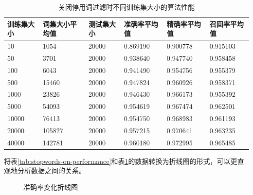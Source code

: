 \documentclass[UTF8,zihao=-4]{ctexart}
\begin{document}
	\begin{table}[H]
		\centering
		\caption{关闭停用词过滤时不同训练集大小的算法性能}
		\label{tab:stopwords-off-performance}
		\begin{tabular}{llllll}
			\toprule
			训练集大小&词集大小平均值&测试集大小&准确率平均值&精确率平均值&召回率平均值\\
			\midrule
			10&1054&20000&0.869190&0.900778&0.915103\\
			50&3701&20000&0.938640&0.947740&0.958458\\
			100&6043&20000&0.941490&0.954756&0.955379\\
			500&15460&20000&0.947824&0.960926&0.958371\\
			1000&23826&20000&0.946430&0.966173&0.955392\\
			5000&54093&20000&0.954619&0.967474&0.962501\\
			10000&76413&20000&0.954750&0.968983&0.961193\\
			20000&105827&20000&0.957215&0.970641&0.963235\\
			40000&142781&20000&0.960180&0.972995&0.965485\\
			\bottomrule
		\end{tabular}
	\end{table}

	将表\ref{tab:stopwords-on-performance}和表\ref{tab:stopwords-off-performance}的数据转换为折线图的形式，可以更直观地分析数据之间的关系。
	
	\begin{figure}[H]
		\centering
	\caption{准确率变化折线图}	\label{fig:accuracy-axis}
	\end{figure}
\end{document}
